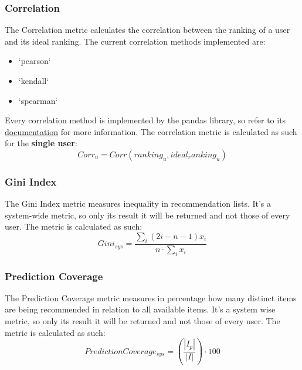 \subsubsection{Correlation}\label{subsubsec:corr}
The Correlation metric calculates the correlation between the ranking of a user and its ideal ranking.
The current correlation methods implemented are:
\begin{itemize}
    \item `pearson`
    \item `kendall`
    \item `spearman`
\end{itemize}
\hfill\break
\hfill\break
Every correlation method is implemented by the pandas library, so refer to its
\href{https://pandas.pydata.org/docs/reference/api/pandas.Series.corr.html}{documentation} for more information.
\hfill\break
\hfill\break
The correlation metric is calculated as such for the \textbf{single user}:
\hfill\break
\hfill\break
    \[
        Corr_u = Corr(ranking_u, ideal_ranking_u)
    \]
\hfill\break


\subsubsection{Gini Index}\label{subsubsec:gini}
The Gini Index metric measures inequality in recommendation lists.
It's a system-wide metric, so only its result it will be returned and not those of every user.
The metric is calculated as such:
\hfill\break
\hfill\break
    \[
        Gini_{sys} = \frac{\sum_i(2i - n - 1)x_i}{n\cdot\sum_i x_i}
    \]
\hfill\break


\subsubsection{Prediction Coverage}\label{subsubsec:pred_cov}
The Prediction Coverage metric measures in percentage how many distinct items are being recommended in relation
to all available items.
It's a system wise metric, so only its result it will be returned and not those of every user.
The metric is calculated as such:
\hfill\break
\hfill\break
    \[
         Prediction Coverage_{sys} = (\frac{|I_p|}{|I|})\cdot100
    \]
\hfill\break

